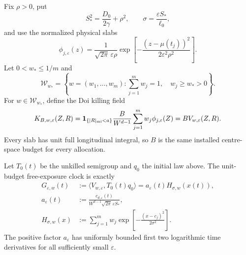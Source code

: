 Fix \(\rho>0\), put
\begin{equation}
 S_*^2=\frac{D_0}{2\gamma}+\rho^2,
 \qquad \sigma=\frac{\varepsilon S_*}{\ell_0},
 \label{eq:exactmfull-common-width}
\end{equation}
and use the normalized physical slabs
\begin{equation}
 \phi_{j,\varepsilon}(z)
 =\frac{1}{\sqrt{2\pi}\,\varepsilon\rho}
  \exp\!\left[-\frac{(z-\mu(t_j))^2}
  {2\varepsilon^2\rho^2}\right].
 \label{eq:exactmfull-slabs}
\end{equation}
Let \(0<w_*\le1/m\) and
\begin{equation}
 \mathcal W_{w_*}
 =\left\{w=(w_1,\ldots,w_m):
   \sum_{j=1}^m w_j=1,\quad w_j\ge w_*>0\right\}.
 \label{eq:exactmfull-weight-set}
\end{equation}
For \(w\in\mathcal W_{w_*}\), define the Doi killing field
\begin{equation}
 K_{B,w,\varepsilon}(Z,R)
 =\mathbf{1}_{\{|R|_{\rm mi}<a\}}
  \frac{B}{W^{d-1}}\sum_{j=1}^m
  w_j\phi_{j,\varepsilon}(Z)
 =B V_{w,\varepsilon}(Z,R).
 \label{eq:exactmfull-killing}
\end{equation}
Every slab has unit full longitudinal integral, so \(B\) is the same
installed centre-space budget for every allocation.

\begin{lemma}
\label{lem:exactmfull-factorization}
Let \(T_0(t)\) be the unkilled semigroup and \(q_0\) the initial law above.
The unit-budget free-exposure clock is exactly
\begin{align}
 G_{\varepsilon,w}(t)
 &:=\langle V_{w,\varepsilon},T_0(t)q_0\rangle
 =a_\varepsilon(t)H_{\sigma,w}(x(t)),
 \label{eq:exactmfull-factorization}\\
 a_\varepsilon(t)
 &:=\frac{c_{d,\varepsilon}(t)}
 {W^{d-1}\sqrt{2\pi}\,\varepsilon S_*},
 \label{eq:exactmfull-slow-factor}\\
 H_{\sigma,w}(x)
 &:=\sum_{j=1}^m w_j
 \exp\!\left[-\frac{(x-c_j)^2}{2\sigma^2}\right].
 \label{eq:exactmfull-mixture}
\end{align}
The positive factor \(a_\varepsilon\) has uniformly bounded first two
logarithmic time derivatives for all sufficiently small \(\varepsilon\).
\end{lemma}

